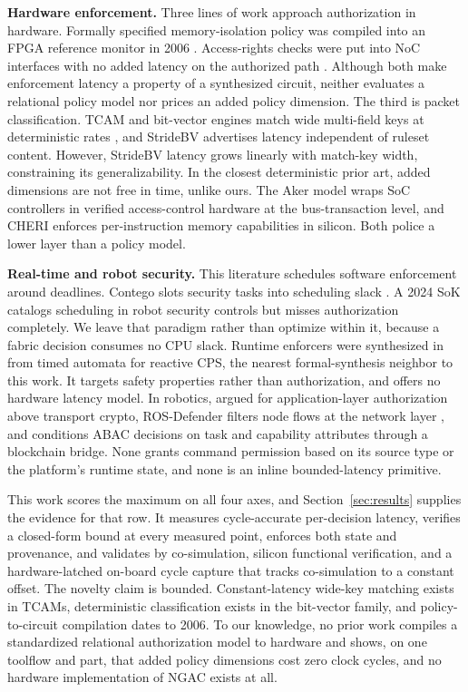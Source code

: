\documentclass[conference]{IEEEtran}
\newcommand{\new}[1]{#1}
\begin{document}
\textbf{Hardware enforcement.} Three lines of work approach authorization in hardware. %
Formally specified memory-isolation policy was compiled into an FPGA reference monitor in 2006 \cite{huffmire2006policy}. %
Access-rights checks were put into NoC interfaces with no added latency on the authorized path \cite{fiorin2008secure}. Although both make enforcement latency a property of a synthesized circuit, neither evaluates a relational policy model nor prices an added policy dimension. %
The third is packet classification. TCAM and bit-vector engines match wide multi-field keys at deterministic rates \cite{song2005bvtcam}, and StrideBV \cite{ganegedara2014scalable} advertises latency independent of ruleset content. However, StrideBV latency grows linearly with match-key width, constraining its generalizability. In the closest deterministic prior art, added dimensions are not free in time, unlike ours. The Aker model \cite{restuccia2021aker} wraps SoC controllers in verified access-control hardware at the bus-transaction level, and CHERI \cite{watson2015cheri} enforces per-instruction memory capabilities in silicon. Both police a lower layer than a policy model.

\textbf{Real-time and robot security.} This literature schedules software enforcement around deadlines. Contego slots security tasks into scheduling slack \cite{hasan2017contego}. A 2024 SoK \cite{hasan2024sok} catalogs scheduling in robot security controls but misses authorization completely. We leave that paradigm rather than optimize within it, because a fabric decision consumes no CPU slack. %
Runtime enforcers were synthesized in \cite{pinisetty2017runtime} from timed automata for reactive CPS, the nearest formal-synthesis neighbor to this work. It targets safety properties rather than authorization, and offers no hardware latency model.
In robotics, \cite{dieber2017security} argued for application-layer authorization above transport crypto, ROS-Defender filters node flows at the network layer \cite{rivera2019rosdefender}, and \cite{salimi2025abac} conditions ABAC decisions on task and capability attributes through a blockchain bridge. None grants command permission based on its source type or the platform's runtime state, and none is an inline bounded-latency primitive.

This work scores the maximum on all four axes, and Section~\ref{sec:results} supplies the evidence for that row. It measures cycle-accurate per-decision latency, verifies a closed-form bound at every measured point, enforces both state and provenance, and validates by co-simulation, silicon functional verification\new{, and a hardware-latched on-board cycle capture that tracks co-simulation to a constant offset}. The novelty claim is bounded. Constant-latency wide-key matching exists in TCAMs, deterministic classification exists in the bit-vector family, and policy-to-circuit compilation dates to 2006. To our knowledge, no prior work compiles a standardized relational authorization model to hardware and shows, on one toolflow and part, that added policy dimensions cost zero clock cycles, and no hardware implementation of NGAC exists at all.
\end{document}
